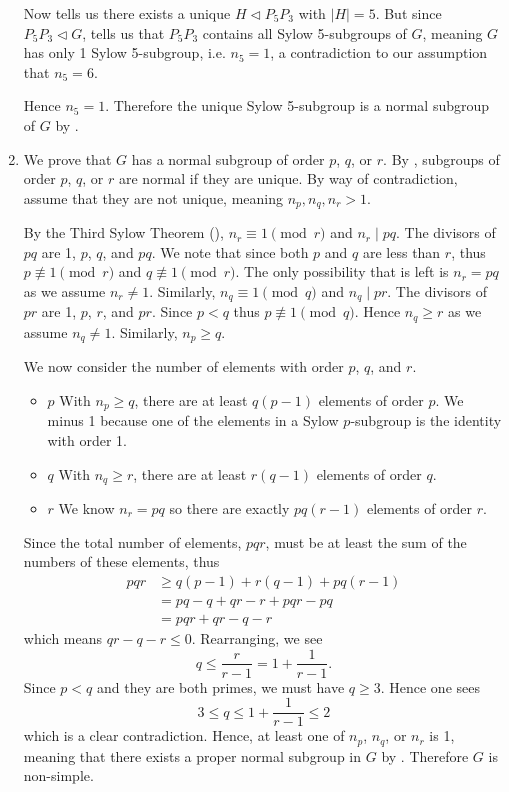 \begin{enumerate}
    Now  tells us there exists a unique $H \lhd P_5P_3$ with $|H| = 5$. But since $P_5P_3 \lhd G$,  tells us that $P_5P_3$ contains all Sylow 5-subgroups of $G$, meaning $G$ has only 1 Sylow 5-subgroup, i.e. $n_5 = 1$, a contradiction to our assumption that $n_5 = 6$.

    Hence $n_5 = 1$. Therefore the unique Sylow 5-subgroup is a normal subgroup of $G$ by .

    \item We prove that $G$ has a normal subgroup of order $p$, $q$, or $r$. By , subgroups of order $p$, $q$, or $r$ are normal if they are unique. By way of contradiction, assume that they are not unique, meaning $n_p, n_q, n_r > 1$.
    
    By the Third Sylow Theorem (), $n_r \equiv 1 \pmod r$ and $n_r \mid pq$. The divisors of $pq$ are 1, $p$, $q$, and $pq$. We note that since both $p$ and $q$ are less than $r$, thus $p \not\equiv 1 \pmod r$ and $q \not\equiv 1 \pmod r$. The only possibility that is left is $n_r = pq$ as we assume $n_r \neq 1$. Similarly, $n_q \equiv 1 \pmod q$ and $n_q \mid pr$. The divisors of $pr$ are 1, $p$, $r$, and $pr$. Since $p < q$ thus $p \not\equiv 1 \pmod q$. Hence $n_q \geq r$ as we assume $n_q \neq 1$. Similarly, $n_p \geq q$.
    
    We now consider the number of elements with order $p$, $q$, and $r$.
    \begin{itemize}
        \item $\boxed{p}$ With $n_p \geq q$, there are at least $q(p-1)$ elements of order $p$. We minus 1 because one of the elements in a Sylow $p$-subgroup is the identity with order 1.
        \item $\boxed{q}$ With $n_q \geq r$, there are at least $r(q-1)$ elements of order $q$.
        \item $\boxed{r}$ We know $n_r = pq$ so there are exactly $pq(r-1)$ elements of order $r$.
    \end{itemize}
    Since the total number of elements, $pqr$, must be at least the sum of the numbers of these elements, thus
    \begin{align*}
        pqr &\geq q(p-1) + r(q-1) + pq(r-1)\\
        &= pq - q + qr - r + pqr - pq\\
        &= pqr + qr - q - r
    \end{align*}
    which means $qr - q - r \leq 0$. Rearranging, we see
    \[
        q \leq \frac{r}{r-1} = 1 + \frac{1}{r-1}.    
    \]
    Since $p < q$ and they are both primes, we must have $q \geq 3$. Hence one sees
    \[
        3 \leq q \leq 1 + \frac{1}{r-1} \leq 2
    \]
    which is a clear contradiction. Hence, at least one of $n_p$, $n_q$, or $n_r$ is 1, meaning that there exists a proper normal subgroup in $G$ by . Therefore $G$ is non-simple.
\end{enumerate}


